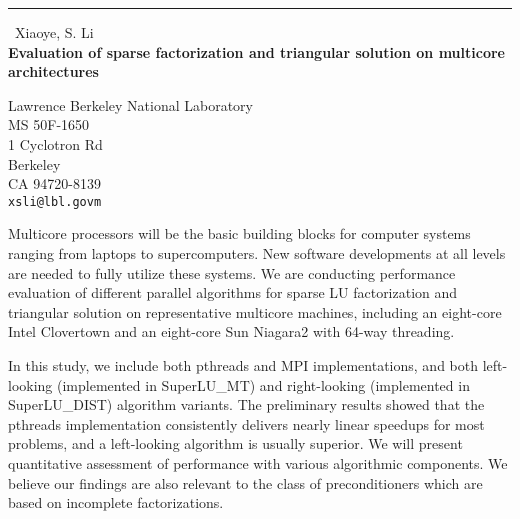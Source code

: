 \documentclass{report}
\begin{document}
\begin{center}
\rule{6in}{1pt} \
{\large Xiaoye, S. Li \\
{\bf Evaluation of sparse factorization and triangular solution on multicore architectures}}

Lawrence Berkeley National Laboratory \\ MS 50F-1650 \\ 1 Cyclotron Rd \\ Berkeley \\ CA 94720-8139
\\
{\tt xsli@lbl.govm}\end{center}

Multicore processors will be the basic building blocks for
computer systems ranging from laptops to supercomputers.
New software developments at all levels are needed to fully
utilize these systems.
We are conducting performance evaluation of different parallel
algorithms for sparse LU factorization and triangular solution
on representative multicore machines, including an eight-core
Intel Clovertown and an eight-core Sun Niagara2 with
64-way threading.

In this study, we include both pthreads and MPI implementations,
and both left-looking (implemented in SuperLU_MT) and
right-looking (implemented in SuperLU_DIST) algorithm variants.
The preliminary results showed that the pthreads implementation
consistently delivers nearly linear speedups for most problems,
and a left-looking algorithm is usually superior.
We will present quantitative assessment of performance with
various algorithmic components. We believe our findings are
also relevant to the class of preconditioners which are based
on incomplete factorizations.
\end{document}
